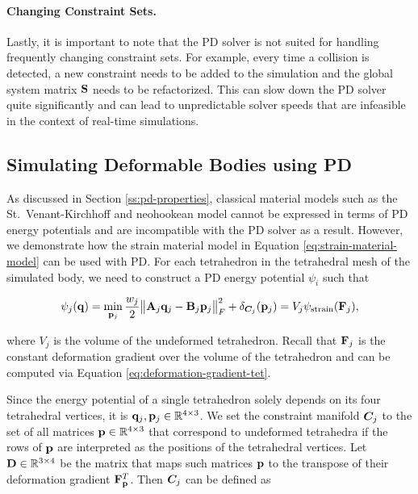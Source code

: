 \paragraph{Changing Constraint Sets.}
Lastly, it is important to note that the PD solver is not suited for handling frequently changing constraint sets. For example, every time 
a collision is detected, a new constraint needs to be added to the simulation and the global system matrix $\mathbf{S}$ needs
to be refactorized. This can slow down the PD solver quite significantly and can lead to unpredictable solver speeds that are infeasible in the
context of real-time simulations.

\subsection{Simulating Deformable Bodies using PD}\label{ss:pd-deformable-bodies}
As discussed in Section \ref{ss:pd-properties}, classical material models such as the St.\ Venant-Kirchhoff and neohookean model cannot be expressed in 
terms of PD energy potentials and are incompatible with the PD solver as a result. However, we demonstrate how the strain material model in 
Equation \ref{eq:strain-material-model} can be used with PD. For each tetrahedron in the tetrahedral mesh of the simulated body, we need to 
construct a PD energy potential $\psi_i$ such that 

\[
    \psi_j(\mathbf{q}) = \min_{\mathbf{p}_j} \frac{w_j}{2} \norm{\mathbf{A}_j\mathbf{q}_j - \mathbf{B}_j\mathbf{p}_j}^2_F + \delta_{\bm{C}_j}(\mathbf{p}_j)
    = V_j\psi_{\text{strain}}(\mathbf{F}_j),
\]

\noindent where $V_j$ is the volume of the undeformed tetrahedron. Recall that $\mathbf{F}_j$ is the constant deformation gradient over the volume 
of the tetrahedron and can be computed via Equation \ref{eq:deformation-gradient-tet}. 

Since the energy potential of a single tetrahedron solely depends on its four tetrahedral vertices, it 
is $\mathbf{q}_j, \mathbf{p}_j \in \mathbb{R}^{4 \times 3}$. We set the constraint manifold $\bm{C}_j$ to the set of all matrices $\mathbf{p} 
\in \mathbb{R}^{4 \times 3}$ that correspond to undeformed tetrahedra if the rows of $\mathbf{p}$ are interpreted as the positions of the 
tetrahedral vertices. Let $\mathbf{D} \in \mathbb{R}^{3 \times 4}$ be the matrix that maps such matrices $\mathbf{p}$ to the transpose of their deformation 
gradient $\mathbf{F}_\mathbf{p}^T$. Then $\bm{C}_j$ can be defined as

